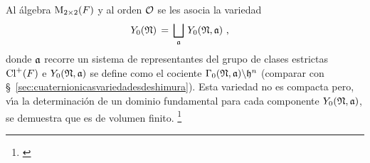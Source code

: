 % 
Al \'{a}lgebra $\MM_{2\times 2}(F)$ y al orden $\cal{O}$ se les asocia la
variedad
\begin{align*}
	Y_{0}(\frak{N}) & \,=\,
		\bigsqcup_{\frak{a}}\,Y_{0}(\frak{N},\frak{a})
	\text{ ,}
\end{align*}
%
donde $\frak{a}$ recorre un sistema de representantes del grupo de clases
estrictas $\pClass{F}$ e $Y_{0}(\frak{N},\frak{a})$ se define como el cociente
$\Gamma_{0}(\frak{N},\frak{a})\backslash\hP^{n}$ (comparar con
\S~\ref{sec:cuaternionicasvariedadesdeshimura}). Esta variedad no es
compacta pero, v\'{\i}a la determinaci\'{o}n de un dominio fundamental para
cada componente $Y_{0}(\frak{N},\frak{a})$, se demuestra que es de volumen
finito.%
\footnote{\cite[Ch.~IV,\S~1]{vanDerGeerSurfaces}}
%
